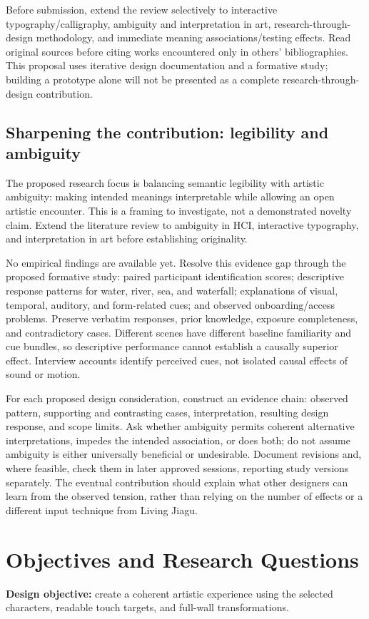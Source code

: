\documentclass[11pt,letterpaper]{article}
\begin{document}
Before submission, extend the review selectively to interactive typography/calligraphy, ambiguity and interpretation in art, research-through-design methodology, and immediate meaning associations/testing effects. Read original sources before citing works encountered only in others' bibliographies. This proposal uses iterative design documentation and a formative study; building a prototype alone will not be presented as a complete research-through-design contribution.

\subsection{Sharpening the contribution: legibility and ambiguity}
The proposed research focus is balancing semantic legibility with artistic ambiguity: making intended meanings interpretable while allowing an open artistic encounter. This is a framing to investigate, not a demonstrated novelty claim. Extend the literature review to ambiguity in HCI, interactive typography, and interpretation in art before establishing originality.

No empirical findings are available yet. Resolve this evidence gap through the proposed formative study: paired participant identification scores; descriptive response patterns for water, river, sea, and waterfall; explanations of visual, temporal, auditory, and form-related cues; and observed onboarding/access problems. Preserve verbatim responses, prior knowledge, exposure completeness, and contradictory cases. Different scenes have different baseline familiarity and cue bundles, so descriptive performance cannot establish a causally superior effect. Interview accounts identify perceived cues, not isolated causal effects of sound or motion.

For each proposed design consideration, construct an evidence chain: observed pattern, supporting and contrasting cases, interpretation, resulting design response, and scope limits. Ask whether ambiguity permits coherent alternative interpretations, impedes the intended association, or does both; do not assume ambiguity is either universally beneficial or undesirable. Document revisions and, where feasible, check them in later approved sessions, reporting study versions separately. The eventual contribution should explain what other designers can learn from the observed tension, rather than relying on the number of effects or a different input technique from Living Jiagu.

\section{Objectives and Research Questions}
\textbf{Design objective:} create a coherent artistic experience using the selected characters, readable touch targets, and full-wall transformations.
\end{document}
